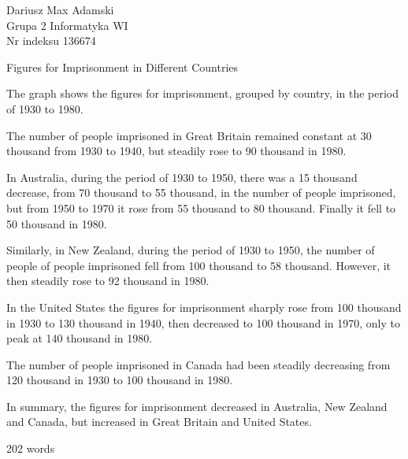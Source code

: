 \documentclass[12pt]{article}
\begin{document}
\begin{flushleft} 
	Dariusz Max Adamski \\
	Grupa 2 Informatyka WI\\
	Nr indeksu 136674
\end{flushleft}

\begin{center} 
	\vspace{0.8cm} \Large
	Figures for Imprisonment in Different Countries
	\vspace{0.5cm}
\end{center}

The graph shows the figures for imprisonment, grouped by country, in the period of 1930 to 1980.

The number of people imprisoned in Great Britain remained constant at 30 thousand from 1930 to 1940, but steadily rose to 90 thousand in 1980.

In Australia, during the period of 1930 to 1950, there was a 15 thousand decrease, from 70 thousand to 55 thousand, in the number of people imprisoned, but from 1950 to 1970 it rose from 55 thousand to 80 thousand. Finally it fell to 50 thousand in 1980.

Similarly, in New Zealand, during the period of 1930 to 1950, the number of people of people imprisoned fell from 100 thousand to 58 thousand. However, it then steadily rose to 92 thousand in 1980.

In the United States the figures for imprisonment sharply rose from 100 thousand in 1930 to 130 thousand in 1940, then decreased to 100 thousand in 1970, only to peak at 140 thousand in 1980.

The number of people imprisoned in Canada had been steadily decreasing from 120 thousand in 1930 to 100 thousand in 1980.

In summary, the figures for imprisonment decreased in Australia, New Zealand and Canada, but increased in Great Britain and United States.

202 words
\end{document}
